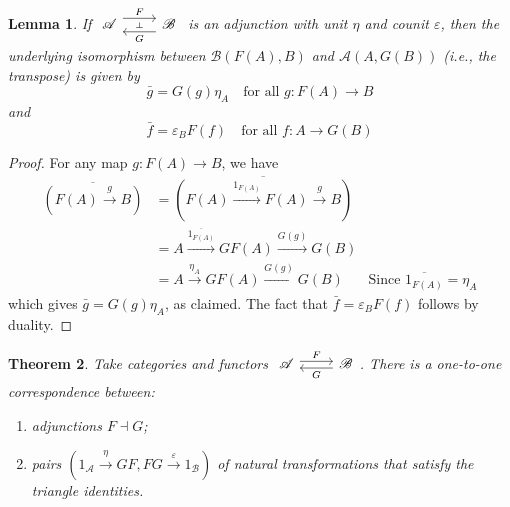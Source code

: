 \documentclass[10pt,oneside]{book}
\def\~#1{\mathscr{#1}}
\def\To#1{\xrightarrow{#1}}
\newcommand{\ve}{\varepsilon}
\theoremstyle{plain}
\newtheorem{thm}{Theorem}[section]
\newtheorem{lem}[thm]{Lemma}
\theoremstyle{definition}
\theoremstyle{remark}
\numberwithin{equation}{section}
\numberwithin{figure}{section}
\begin{document}
\begin{lem}
\label{lem:transpose}
If $\begin{tikzcd}
    {\~A} & {\~B}
    \arrow[""{name=0, anchor=center, inner sep=0}, "F", shift left=2, from=1-1, to=1-2]
    \arrow[""{name=1, anchor=center, inner sep=0}, "G", shift left=2, from=1-2, to=1-1]
    \arrow["\dashv"{anchor=center, rotate=-90}, draw=none, from=0, to=1]
\end{tikzcd}$ is an adjunction with unit $\eta$ and counit $\ve$, then the underlying isomorphism between $\~B(F(A), B)$ and $\~A(A, G(B))$ (i.e., the transpose) is given by
\[\bar{g} = G(g)\eta_A  \quad \text{for all } g: F(A) \to B\]
and
\[\bar{f} = \ve_B F(f)  \quad \text{for all } f: A \to G(B)\]
\end{lem}
\begin{proof}
    For any map $g: F(A) \to B$, we have 
    \begin{align*}
        \overline{\left( F(A) \To{g} B \right)} &= \overline{\left( F(A)\To{1_{F(A)}} F(A) \To{g} B \right)} \\
        &= A \To{\overline{1_{F(A)}}} GF(A) \To{G(g)} G(B) \\
        &= A \To{\eta_A} GF(A) \To{G(g)} G(B) & \text{Since } \overline{1_{F(A)}} = \eta_A
    \end{align*}
    which gives $\bar{g} = G(g)\eta_A$, as claimed. The fact that $\bar{f} =\ve_B F(f)$ follows by duality.
\end{proof}

\begin{thm}
\label{thm:adj_triangles}
    Take categories and functors $\begin{tikzcd}
    {\~A} & {\~B}
    \arrow["F", shift left, from=1-1, to=1-2]
    \arrow["G", shift left, from=1-2, to=1-1]
\end{tikzcd}$. There is a one-to-one correspondence between:
\begin{enumerate}[label=(\roman*)]
    \item adjunctions $F \dashv G$;
    \item pairs $(1_{\~A} \To{\eta} GF, FG \To{\ve} 1_{\~B})$ of natural transformations that satisfy the triangle identities.
\end{enumerate}
\end{thm}
\end{document}

